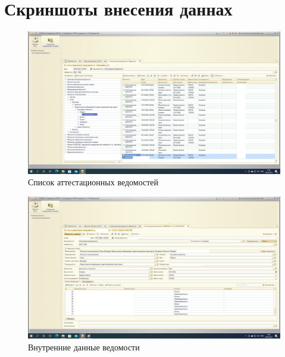\documentclass[12pt,a4paper]{scrartcl}
\begin{document}
\section{Скриншоты внесения даннах}
\label{sec:picexample}
\begin{figure}[h]
	\centering
	\includegraphics[width=0.8 \textwidth]{
Картинка_1.png}
	\caption{Список аттестационных ведомостей}\label{fig:par}
\end{figure}

\begin{figure}[h]
	\centering
	\includegraphics[width=0.8 \textwidth]{
Картинка_2.png}
	\caption{Внутренние данные ведомости}\label{fig:par}
\end{figure}
\end{document}
